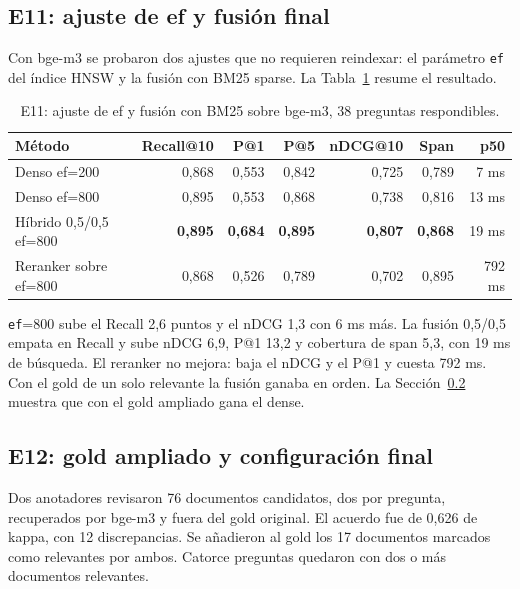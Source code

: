 \documentclass[11pt]{tg_usta}
\begin{document}
\subsection{E11: ajuste de ef y fusión final}
\label{sec:ajuste}

Con bge-m3 se probaron dos ajustes que no requieren reindexar: el parámetro \texttt{ef} del índice HNSW y la fusión con BM25 sparse. La Tabla~\ref{tab:e11} resume el resultado.

\begin{table}[htbp]
\centering
\footnotesize
\begin{tabular}{@{}lrrrrrr@{}}
\toprule
Método & Recall@10 & P@1 & P@5 & nDCG@10 & Span & p50 \\
\midrule
Denso ef=200 & 0,868 & 0,553 & 0,842 & 0,725 & 0,789 & 7 ms \\
Denso ef=800 & 0,895 & 0,553 & 0,868 & 0,738 & 0,816 & 13 ms \\
Híbrido 0,5/0,5 ef=800 & \textbf{0,895} & \textbf{0,684} & \textbf{0,895} & \textbf{0,807} & \textbf{0,868} & 19 ms \\
Reranker sobre ef=800 & 0,868 & 0,526 & 0,789 & 0,702 & 0,895 & 792 ms \\
\bottomrule
\end{tabular}
\caption{E11: ajuste de ef y fusión con BM25 sobre bge-m3, 38 preguntas respondibles.}
\label{tab:e11}
\end{table}

\texttt{ef}=800 sube el Recall 2,6 puntos y el nDCG 1,3 con 6 ms más. La fusión 0,5/0,5 empata en Recall y sube nDCG 6,9, P@1 13,2 y cobertura de span 5,3, con 19 ms de búsqueda. El reranker no mejora: baja el nDCG y el P@1 y cuesta 792 ms. Con el gold de un solo relevante la fusión ganaba en orden. La Sección~\ref{sec:ampliado} muestra que con el gold ampliado gana el dense.

\subsection{E12: gold ampliado y configuración final}
\label{sec:ampliado}

Dos anotadores revisaron 76 documentos candidatos, dos por pregunta, recuperados por bge-m3 y fuera del gold original. El acuerdo fue de 0,626 de kappa, con 12 discrepancias. Se añadieron al gold los 17 documentos marcados como relevantes por ambos. Catorce preguntas quedaron con dos o más documentos relevantes.
\end{document}
